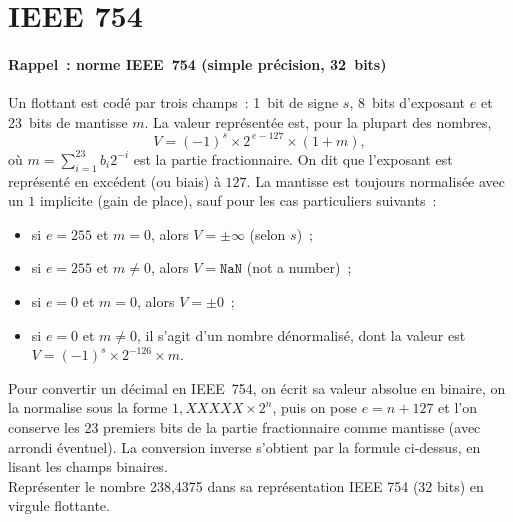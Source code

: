 \documentclass[a4paper,11pt]{article}
\begin{document}
\section{IEEE 754}
\paragraph{Rappel~: norme IEEE~754 (simple précision, 32~bits)}
Un flottant est codé par trois champs~: 1~bit de signe $s$, 8~bits d'exposant $e$ et 23~bits de mantisse $m$.
La valeur représentée est, pour la plupart des nombres,
\[
V = (-1)^s \times 2^{\,e-127} \times (1 + m),
\]
où $m = \sum_{i=1}^{23} b_i 2^{-i}$ est la partie fractionnaire.
On dit que l'exposant est représenté en excédent (ou biais) à $127$.
La mantisse est toujours normalisée avec un $1$ implicite (gain de place), sauf pour les cas particuliers suivants~:
\begin{itemize}
\item si $e=255$ et $m=0$, alors $V = \pm\infty$ (selon $s$)~;
\item si $e=255$ et $m\neq 0$, alors $V = \mathtt{NaN}$ (not a number)~;
\item si $e=0$ et $m=0$, alors $V = \pm 0$~;
\item si $e=0$ et $m\neq 0$, il s'agit d'un nombre dénormalisé, dont la valeur est
$V = (-1)^s \times 2^{-126} \times m$.
\end{itemize}
Pour convertir un décimal en IEEE~754, on écrit sa valeur absolue en binaire, on la normalise sous la forme $1,\!XXXXX \times 2^n$, puis on pose $e = n+127$ et l'on conserve les 23 premiers bits de la partie fractionnaire comme mantisse (avec arrondi éventuel).
La conversion inverse s'obtient par la formule ci-dessus, en lisant les champs binaires.\\

Représenter le nombre 238,4375 dans sa représentation IEEE 754 (32 bits) en virgule flottante.







\end{document}
